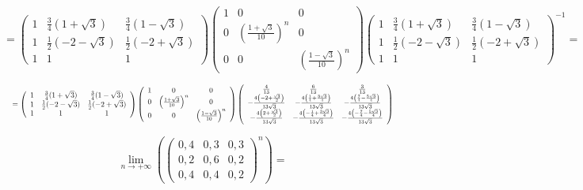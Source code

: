 \documentclass[a4paper,12pt]{article} %
\begin{document}
\begin{example}
\[ 
=\left(\begin{array}{ccc}
1 & \frac{3}{4}(1+\sqrt{3}) & \frac{3}{4}(1-\sqrt{3}) \\
1 & \frac{1}{2}(-2-\sqrt{3}) & \frac{1}{2}(-2+\sqrt{3}) \\
1 & 1 & 1
\end{array}\right)
\left(\begin{array}{ccc}
1 & 0 & 0 \\
0 & \left(\frac{1+\sqrt{3}}{10}\right)^{n} & 0 \\
0 & 0 & \left(\frac{1-\sqrt{3}}{10}\right)^n
\end{array}\right)
\left(\begin{array}{ccc}
1 & \frac{3}{4}(1+\sqrt{3}) & \frac{3}{4}(1-\sqrt{3}) \\
1 & \frac{1}{2}(-2-\sqrt{3}) & \frac{1}{2}(-2+\sqrt{3}) \\
1 & 1 & 1
\end{array}\right)^{-1}= 
\]



\[ 
   \resizebox{\hsize}{!}{%
	$=\left(\begin{array}{ccc}
	1 & \frac{3}{4}(1+\sqrt{3}) & \frac{3}{4}(1-\sqrt{3}) \\
	1 & \frac{1}{2}(-2-\sqrt{3}) & \frac{1}{2}(-2+\sqrt{3}) \\
	1 & 1 & 1
\end{array}\right) 
\left(\begin{array}{ccc}
	1 & 0 &  0 \\
	0 & \left(\frac{1+\sqrt{3}}{10}\right)^{n} &  0 \\
	0 & 0 &  \left(\frac{1-\sqrt{3}}{10}\right)^{n}
\end{array}\right)
\left(\begin{array}{ccc}
	\frac{4}{13} & \frac{6}{13} & \frac{3}{13} \\
	-\frac{4\left(-2+\frac{\sqrt{3}}{2}\right)}{13 \sqrt{3}} & -\frac{4\left(\frac{1}{4}+\frac{3 \sqrt{3}}{4}\right)}{13 \sqrt{3}} & -\frac{4\left(\frac{7}{4}-\frac{5 \sqrt{3}}{4}\right)}{13 \sqrt{3}} \\
	-\frac{4\left(2+\frac{\sqrt{3}}{2}\right)}{13 \sqrt{3}} & -\frac{4\left(-\frac{1}{4}+\frac{3 \sqrt{3}}{4}\right)}{13 \sqrt{3}} & -\frac{4\left(-\frac{7}{4}-\frac{5 \sqrt{3}}{4}\right)}{13 \sqrt{3}}
\end{array}\right)
$}
\]





\[ \lim _{n \rightarrow+\infty}\left(\left(\begin{array}{ccc}
0,4 & 0,3 & 0,3 \\
0,2 & 0,6 & 0,2 \\
0,4 & 0,4 & 0,2
\end{array}\right)^{n}\right)= \]




\end{example}
\end{document}
